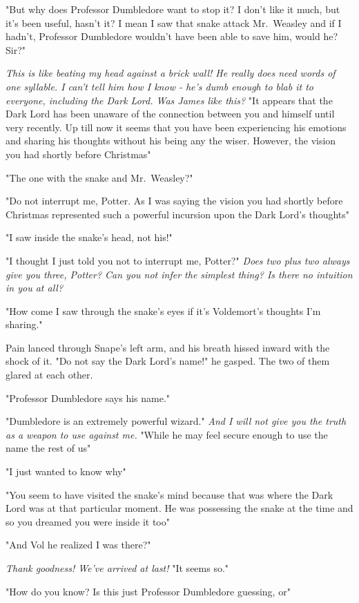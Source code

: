 "But why does Professor Dumbledore want to stop it? I don't like it much, but it's been useful, hasn't it? I mean{\el} I saw that snake attack Mr.~Weasley and if I hadn't, Professor Dumbledore wouldn't have been able to save him, would he? Sir?"

\emph{This is like beating my head against a brick wall! He really does need words of one syllable. I can't tell him how I know - he's dumb enough to blab it to everyone, including the Dark Lord. Was James like this?} "It appears that the Dark Lord has been unaware of the connection between you and himself until very recently. Up till now it seems that you have been experiencing his emotions and sharing his thoughts without his being any the wiser. However, the vision you had shortly before Christmas{\el}"

"The one with the snake and Mr.~Weasley?"

"Do not interrupt me, Potter. As I was saying{\el} the vision you had shortly before Christmas represented such a powerful incursion upon the Dark Lord's thoughts{\el}"

"I saw inside the snake's head, not his!"

"I thought I just told you not to interrupt me, Potter?" \emph{Does two plus two always give you three, Potter? Can you not infer the simplest thing? Is there no intuition in you at all?}

"How come I saw through the snake's eyes if it's Voldemort's thoughts I'm sharing."

Pain lanced through Snape's left arm, and his breath hissed inward with the shock of it. "Do not say the Dark Lord's name!" he gasped. The two of them glared at each other.

"Professor Dumbledore says his name."

"Dumbledore is an extremely powerful wizard." \emph{And I will not give you the truth as a weapon to use against me.} "While he may feel secure enough to use the name{\el} the rest of us{\el}"

"I just wanted to know why{\el}"

"You seem to have visited the snake's mind because that was where the Dark Lord was at that particular moment. He was possessing the snake at the time and so you dreamed you were inside it too{\el}"

"And Vol{\el} he{\el} realized I was there?"

\emph{Thank goodness! We've arrived at last!} "It seems so."

"How do you know? Is this just Professor Dumbledore guessing, or{\el}"

